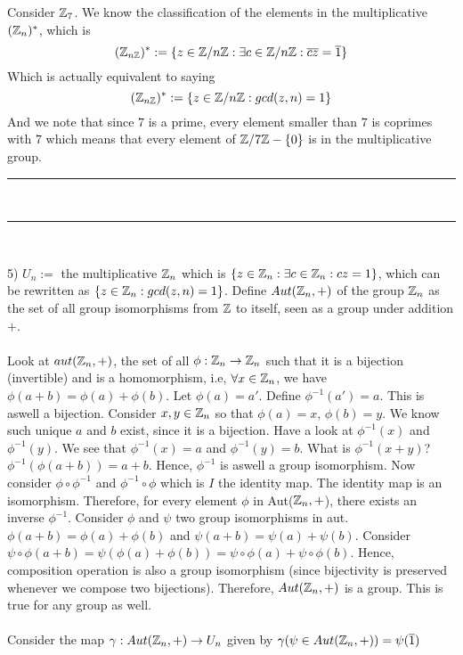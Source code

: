 \documentclass[../Main.tex]{subfiles}
\begin{document}
\\\\ Consider $\mathbb Z_7$. We know the classification of the elements in the multiplicative $(\mathbb Z_n)^*$, which is $$(\mathbb Z_{n\mathbb Z})^*:=\{z \in \mathbb Z/ n\mathbb Z: \exists c \in \mathbb Z/ n\mathbb Z: \overline{c}\overline{z}=\overline{1}\}$$ Which is actually equivalent to saying
$$(\mathbb Z_{n\mathbb Z})^*:=\{z \in \mathbb Z/ n\mathbb Z: gcd(z,n)=1\}$$ And we note that since $7$ is a prime, every element smaller than $7$ is coprimes with $7$ which means that every element of $\mathbb Z/ 7\mathbb Z-\{0\}$ is in the multiplicative group.
\begin{center}    
    \rule[1ex]{.8\textwidth}{1pt}\\
    \rule[1.9ex]{.7\textwidth}{.6pt}\\[-6pt]
    
\end{center}
5) $U_n:=$ the multiplicative $\mathbb Z_n$ which is $\{z \in \mathbb Z_n: \exists c \in \mathbb Z_n: cz=1\}$, which can be rewritten as $\{z \in \mathbb Z_n: gcd(z,n)=1\}$. Define $Aut(\mathbb Z_n,+)$ of the group $\mathbb Z_n$ as the set of all group isomorphisms from $\mathbb Z$ to itself, seen as a group under addition $+$. 
\\\\ Look at $aut(\mathbb Z_n,+)$, the set of all $\phi:\mathbb Z_n \to \mathbb Z_n$ such that it is a bijection (invertible) and is a homomorphism, i.e, $\forall x \in \mathbb Z_n$, we have $\phi(a+b)=\phi(a)+\phi(b)$. Let $\phi(a)=a'$. Define $\phi^{-1}(a')=a$. This is aswell a bijection. Consider $x,y \in \mathbb Z_n$ so that $\phi(a)=x$, $\phi(b)=y$. We know such unique $a$ and $b$ exist, since it is a bijection. Have a look at $\phi^{-1}(x)$ and $\phi^{-1}(y)$. We see that $\phi^{-1}(x)=a$ and $\phi^{-1}(y)=b$. What is $\phi^{-1}(x+y)$? $\phi^{-1}(\phi(a+b))=a+b$. Hence, $\phi^{-1}$ is aswell a group isomorphism. Now consider $\phi \circ \phi^{-1}$ and $\phi^{-1} \circ \phi$ which is $I$ the identity map. The identity map is an isomorphism. Therefore, for every element $\phi$ in Aut($\mathbb Z_n, +$), there exists an inverse $\phi^{-1}$. Consider $\phi$ and $\psi$ two group isomorphisms in aut. $\phi(a+b)=\phi(a)+\phi(b)$ and $\psi(a+b)=\psi(a)+\psi(b)$. Consider $\psi \circ \phi(a+b)=\psi(\phi(a)+\phi(b))=\psi \circ \phi(a)+\psi \circ \phi(b)$. Hence, composition operation is also a group isomorphism (since bijectivity is preserved whenever we compose two bijections). Therefore, $Aut(\mathbb Z_n,+)$ is a group. This is true for any group as well.
\\\\ Consider the map $\gamma: Aut(\mathbb Z_n,+) \to U_n$ given by $\gamma(\psi \in Aut(\mathbb Z_n,+))=\psi(\overline{1})$
\end{document}

